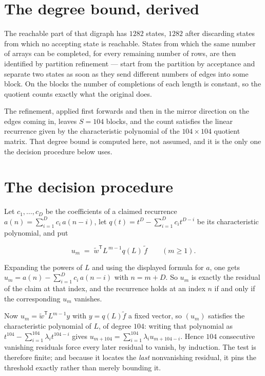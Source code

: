 \documentclass[11pt]{article}
\theoremstyle{definition}
\begin{document}
\section{The degree bound, derived}

The reachable part of that digraph has $1282$ states, $1282$ after discarding states from which no accepting state is reachable. States from which the same number of arrays can be completed, for every remaining number of rows, are then identified by partition refinement --- start from the partition by acceptance and separate two states as soon as they send different numbers of edges into some block. On the blocks the number of completions of each length is constant, so the quotient counts exactly what the original does.

The refinement, applied first forwards and then in the mirror direction on the edges coming in, leaves $S = 104$ blocks, and the count satisfies the linear recurrence given by the characteristic polynomial of the $104 \times 104$ quotient matrix. That degree bound is computed here, not assumed, and it is the only one the decision procedure below uses.

\section{The decision procedure}

Let $c_1,\dots,c_D$ be the coefficients of a claimed recurrence $a(n) = \sum_{i=1}^{D} c_i\,a(n-i)$, let $q(t) = t^{D} - \sum_{i=1}^{D} c_i t^{D-i}$ be its characteristic polynomial, and put

\[u_m \;=\; \tilde w^{\mathsf T} L^{\,m-1} q(L)\,\tilde f \qquad (m \ge 1).\]

Expanding the powers of $L$ and using the displayed formula for $a$, one gets $u_m = a(n) - \sum_{i=1}^{D} c_i\,a(n-i)$ with $n = m + D$. So $u_m$ is exactly the residual of the claim at that index, and the recurrence holds at an index $n$ if and only if the corresponding $u_m$ vanishes.

Now $u_m = \tilde w^{\mathsf T} L^{m-1} y$ with $y = q(L)\tilde f$ a fixed vector, so $(u_m)$ satisfies the characteristic polynomial of $L$, of degree $104$: writing that polynomial as $t^{104} - \sum_{i=1}^{104} \lambda_i t^{104-i}$ gives $u_{m+104} = \sum_{i=1}^{104} \lambda_i u_{m+104-i}$. Hence $104$ consecutive vanishing residuals force every later residual to vanish, by induction. The test is therefore finite; and because it locates the {\itshape last} nonvanishing residual, it pins the threshold exactly rather than merely bounding it.
\end{document}
